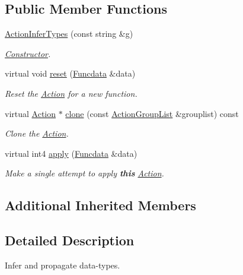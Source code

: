 \subsection*{Public Member Functions}
\begin{DoxyCompactItemize}
\item 
\mbox{\hyperlink{class_action_infer_types_a0c48c0551fda1e65454138e573f0cb41}{Action\+Infer\+Types}} (const string \&g)
\begin{DoxyCompactList}\small\item\em \mbox{\hyperlink{class_constructor}{Constructor}}. \end{DoxyCompactList}\item 
virtual void \mbox{\hyperlink{class_action_infer_types_ae597b86eb6180b289bd0f32a607c6198}{reset}} (\mbox{\hyperlink{class_funcdata}{Funcdata}} \&data)
\begin{DoxyCompactList}\small\item\em Reset the \mbox{\hyperlink{class_action}{Action}} for a new function. \end{DoxyCompactList}\item 
virtual \mbox{\hyperlink{class_action}{Action}} $\ast$ \mbox{\hyperlink{class_action_infer_types_ac986d89b2fed20d29ded26939f5a90b8}{clone}} (const \mbox{\hyperlink{class_action_group_list}{Action\+Group\+List}} \&grouplist) const
\begin{DoxyCompactList}\small\item\em Clone the \mbox{\hyperlink{class_action}{Action}}. \end{DoxyCompactList}\item 
virtual int4 \mbox{\hyperlink{class_action_infer_types_a0f50c538353ecf22ba3651d8e1a661ed}{apply}} (\mbox{\hyperlink{class_funcdata}{Funcdata}} \&data)
\begin{DoxyCompactList}\small\item\em Make a single attempt to apply {\bfseries{this}} \mbox{\hyperlink{class_action}{Action}}. \end{DoxyCompactList}\end{DoxyCompactItemize}
\subsection*{Additional Inherited Members}


\subsection{Detailed Description}
Infer and propagate data-\/types. 

